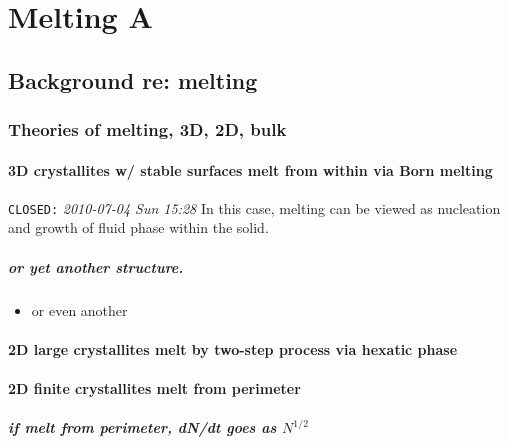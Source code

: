 \documentclass{umthesis}
\begin{document}
\mainmatter



\chapter{Melting A}
\label{sec-1}
\section{Background re: melting}
\label{sec-1.1}
\subsection{Theories of melting, 3D, 2D, bulk}
\label{sec-1.1.1}
\subsubsection{3D crystallites w/ stable surfaces melt from within via Born melting}
\label{sec-1.1.1.1}

     \texttt{CLOSED:} \textit{2010-07-04 Sun 15:28}\newline
In this case, melting can be viewed as nucleation and growth of fluid phase within the solid.
\paragraph{or yet another structure.}
\label{sec-1.1.1.1.1}
\begin{itemize}

\item or even another\\
\label{sec-1.1.1.1.1.1}%
\end{itemize} %
\subsubsection{2D large crystallites melt by two-step process via hexatic phase}
\label{sec-1.1.1.2}
\subsubsection{2D finite crystallites melt from perimeter}
\label{sec-1.1.1.3}
\paragraph{if melt from perimeter, dN/dt goes as $N^{1/2}$}
\label{sec-1.1.1.3.1}
\end{document}
